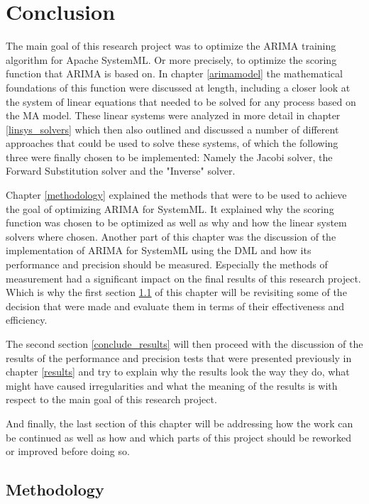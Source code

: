 \chapter{Conclusion}

The main goal of this research project was to optimize the \acs{ARIMA} training algorithm for Apache SystemML. Or more precisely, to optimize the scoring function that \acs{ARIMA} is based on. In chapter \ref{arimamodel} the mathematical foundations of this function were discussed at length, including a closer look at the system of linear equations that needed to be solved for any process based on the \acl{MA} model. These linear systems were analyzed in more detail in chapter \ref{linsys_solvers} which then also outlined and discussed a number of different approaches that could be used to solve these systems, of which the following three were finally chosen to be implemented: Namely the Jacobi solver, the Forward Substitution solver and the "Inverse" solver.

Chapter \ref{methodology} explained the methods that were to be used to achieve the goal of optimizing \acs{ARIMA} for SystemML. It explained why the scoring function was chosen to be optimized as well as why and how the linear system solvers where chosen. Another part of this chapter was the discussion of the implementation of \acs{ARIMA} for SystemML using the \acl{DML} and how its performance and precision should be measured. Especially the methods of measurement had a significant impact on the final results of this research project. Which is why the first section \ref{conclude_method} of this chapter will be revisiting some of the decision that were made and evaluate them in terms of their effectiveness and efficiency.

The second section \ref{conclude_results} will then proceed with the discussion of the results of the performance and precision tests that were presented previously in chapter \ref{results} and try to explain why the results look the way they do, what might have caused irregularities and what the meaning of the results is with respect to the main goal of this research project. 

And finally, the last section of this chapter will be addressing how the work can be continued as well as how and which parts of this project should be reworked or improved before doing so.

\section{Methodology}\label{conclude_method}

